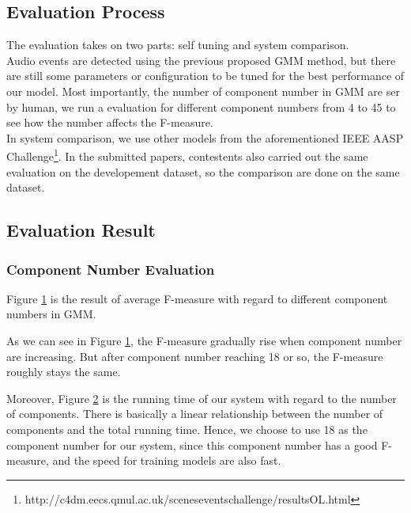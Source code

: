 \subsection{Evaluation Process}
The evaluation takes on two parts: self tuning and system comparison. \\ 

Audio events are detected using the previous proposed GMM method, but there are still some parameters or configuration to be tuned for the best performance of our model.
Most importantly, the number of component number in GMM are ser by human, we run a evaluation for different component numbers from 4 to 45 to see how the number affects the F-measure. \\ 

In system comparison, we use other models from the aforementioned IEEE AASP Challenge\footnote{http://c4dm.eecs.qmul.ac.uk/sceneseventschallenge/resultsOL.html}. 
In the submitted papers, contestents also carried out the same evaluation on the developement dataset, so the comparison are done on the same dataset.  

\subsection{Evaluation Result}
\subsubsection{Component Number Evaluation}
Figure \ref{fig:component} is the result of average F-measure with regard to different component numbers in GMM. 
\begin{figure}[htb]
\centering

\caption{}
\label{fig:component}
\end{figure}

As we can see in Figure \ref{fig:component}, the F-measure gradually rise when component number are increasing. 
But after component number reaching 18 or so, the F-measure roughly stays the same. \\ 

\begin{figure}[htb]
\centering

\caption{}
\label{fig:componentTime}
\end{figure}
Moreover, Figure \ref{fig:componentTime} is the running time of our system with regard to the number of components. 
There is basically a linear relationship between the number of components and the total running time. 
Hence, we choose to use 18 as the component number for our system, since this component number has a good F-measure, and the speed for training models are also fast.\\ 

